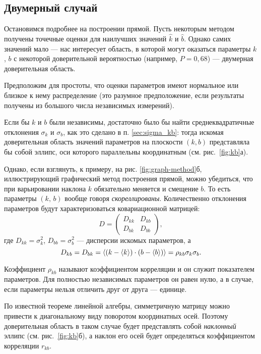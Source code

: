\subsection{Двумерный случай}
Остановимся подробнее на построении прямой. Пусть некоторым методом получены
точечные оценки для наилучших значений $\hat{k}$ и $\hat{b}$.
Однако самих значений мало --- нас интересует область, в которой могут
оказаться параметры $k$, $b$ с некоторой доверительной вероятностью
(например, $P=0,68$) --- двумерная доверительная область.

Предположим для простоты, что оценки параметров имеют нормальное или близкое
к нему распределение (это разумное предположение, если результаты получены
из большого числа независимых измерений).

Если бы $k$ и $b$ были независимы, достаточно было бы найти среднеквадратичные
отклонения $\sigma_k$ и $\sigma_b$, как это сделано в п. \ref{sec:sigma_kb}:
тогда искомая доверительная область значений параметров на плоскости $(k,b)$
представляла бы собой эллипс, оси которого параллельны координатным
(см. рис.~\ref{fig:kb}а).

Однако, если взглянуть, к примеру, на рис. \ref{fig:graph-method}б, иллюстрирующий
графический метод построения прямой, можно убедиться, что при варьировании
наклона $k$ обязательно меняется и смещение $b$. То есть параметры
$(k,\,b)$ вообще говоря \emph{скореллированы}. Количественно отклонения параметров
будут характеризоваться ковариационной матрицей:
\[
D = \left(\begin{matrix}
    D_{kk} & D_{kb} \\
    D_{bk} & D_{bb}
\end{matrix}\right),
\]
где $D_{kk}=\sigma_k^2$, $D_{bb}=\sigma_b^2$ --- дисперсии искомых параметров,
а 
\begin{equation*}
    D_{kb}=D_{bk} = \left<(k-\left<k\right>)\cdot(b-\left<b\right>)\right> = \rho_{kb}\sigma_k\sigma_b.  
\end{equation*}

Коэффициент $\rho_{kb}$ называют коэффициентом корреляции и он служит показателем  параметров. Для полностью независимых параметров он равен нулю, а в случае, если параметры нельзя отличить друг от друга --- единице.

По известной теореме линейной алгебры, симметричную матрицу можно
привести к диагональному виду поворотом координатных осей. Поэтому доверительная
область в таком случае будет представлять собой \emph{наклонный} эллипс
(см. рис.~\ref{fig:kb}б), а наклон его осей будет определяться
коэффициентом корреляции $r_{kb}$.

